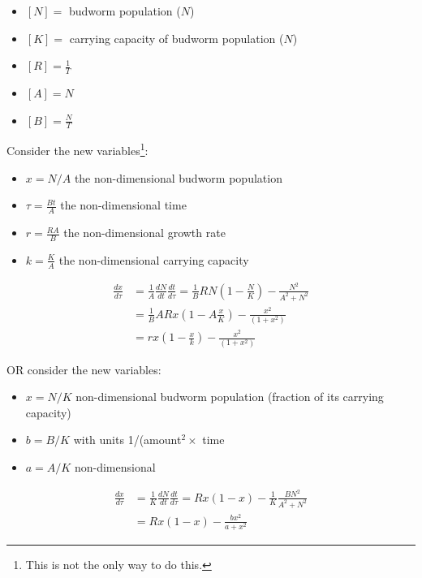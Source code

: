 \begin{solution}
\begin{slide}

\begin{parts}
	\item \begin{itemize}
		\item $[N] =$ budworm population ($N$)
		\item $[K] =$  carrying capacity of budworm population ($N$)
		\item $[R] =\frac{1}{T}$ 
		\item $[A] = N$
		\item $[B] = \frac{N}{T}$
 	\end{itemize}
 	
 	\item Consider the new variables\footnote{This is not the only way to do this.}:
		\begin{itemize}
			\item $x = N/A$ the non-dimensional budworm population
			\item $\tau = \frac{Bt}{A}$ the non-dimensional time
			\item $r = \frac{RA}{B}$ the non-dimensional growth rate
			\item $k = \frac{K}{A}$ the non-dimensional carrying capacity
		\end{itemize}


	\begin{align*}
		\frac{dx}{d\tau} 
			& = \frac{1}{A} \frac{dN}{dt} \frac{dt}{d\tau}
			= \frac{1}{B} R N \left( 1 - \frac{N}{K} \right) - \frac{N^2}{A^2 + N^2} \\
			& = \frac{1}{B} A R x \left( 1 - A\frac{x}{K} \right) - \frac{x^2}{(1 + x^2)} \\
			& = r x \left(1-\frac{x}{k}\right)- \frac{x^2}{(1 + x^2)}
	\end{align*}


	OR consider the new variables:
	\begin{itemize}
		\item $x = N/K$ non-dimensional budworm population (fraction of its carrying capacity)
		\item $b = B/K$ with units 1/(amount$^2 \times$ time
		\item $a = A/K$ non-dimensional
	\end{itemize}
	
	\begin{align*}
		\frac{dx}{d\tau} 
			& = \frac{1}{K} \frac{dN}{dt} \frac{dt}{d\tau}
			= R x \left( 1 - x \right) - \frac{1}{K}\frac{B N^2}{A^2 + N^2} \\
			& = R x \left( 1 - x \right) - \frac{b x^2}{a + x^2}
	\end{align*}


	
\end{parts}	
	
\end{slide}

\end{solution}	







